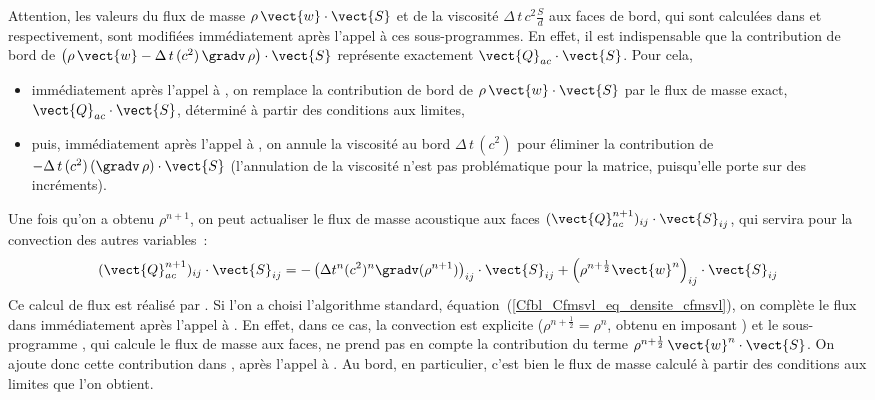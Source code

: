 Attention, les valeurs du flux de masse $\rho\,\vect{w}\cdot\vect{S}$ et
de la viscosité $\Delta\,t\,c^2\frac{S}{d}$ aux faces de
bord, qui sont calculées dans  et  respectivement,
sont modifiées immédiatement après l'appel à ces sous-programmes.
En effet, il est indispensable que la contribution de bord de
$\left(\rho\,\vect{w}-\Delta\,t\,(c^2)\,\gradv\,\rho\right)\cdot\vect{S}$
représente exactement $\vect{Q}_{ac}\cdot\vect{S}$.
Pour cela,
\begin{itemize}
\item immédiatement après l'appel à
, on remplace la contribution de bord de
$\rho\,\vect{w}\cdot\vect{S}$
par le flux de masse exact, $\vect{Q}_{ac}\cdot\vect{S}$,
déterminé à partir des conditions aux limites,
\item puis, immédiatement après l'appel à
, on annule la viscosité au bord $\Delta\,t\,(c^2)$ pour
éliminer la contribution de $-\Delta\,t\,(c^2)\,(\gradv\,\rho)\cdot\vect{S}$
(l'annulation de la viscosité n'est pas problématique pour la matrice,
puisqu'elle porte sur des incréments).
\end{itemize}

\bigskip

Une fois qu'on a obtenu $\rho^{n+1}$,
on peut actualiser le flux de masse acoustique
aux faces $(\vect{Q}_{ac}^{n+1})_{ij} \cdot \vect{S}_{ij}$,
qui servira pour la convection des autres variables~:
\begin{equation}\label{Cfbl_Cfmsvl_eq_flux_masse_acoustique_cfmsvl}
\displaystyle(\vect{Q}_{ac}^{n+1})_{ij}\cdot\vect{S}_{ij}=
-\left(\Delta t^n (c^2)^n \gradv(\rho^{n+1})\right)_{ij}\cdot\vect{S}_{ij}
+\left(\rho^{n+\frac{1}{2}} \vect{w}^n\right)_{ij}\cdot\vect{S}_{ij}\\
\end{equation}
Ce calcul de flux est réalisé par .
Si l'on a choisi l'algorithme standard, équation~(\ref{Cfbl_Cfmsvl_eq_densite_cfmsvl}),
on complète le flux dans  immédiatement après l'appel
à .
En effet, dans ce cas,
la convection est explicite ($\rho^{n+\frac{1}{2}}=\rho^{n}$,
obtenu en imposant )
et le sous-programme ,
qui calcule le flux de masse aux faces,
ne prend pas en compte la contribution du terme
$\rho^{n+\frac{1}{2}}\,\vect{w}^n\cdot\vect{S}$. On ajoute donc cette
contribution dans , après l'appel à .
Au bord, en particulier, c'est bien le flux de masse calculé à partir
des conditions aux limites que l'on obtient.

